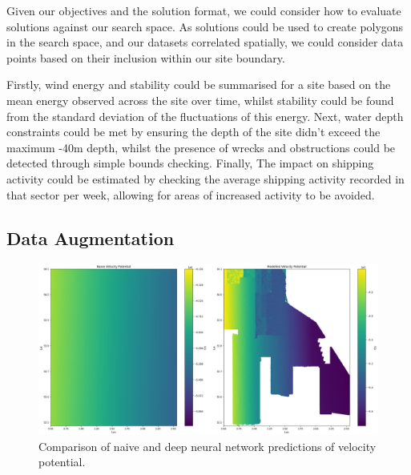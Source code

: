 \documentclass[preprint,12pt]{elsarticle}
\begin{document}
Given our objectives and the solution format, we could consider how to evaluate solutions against our search space. As solutions could be used to create polygons in the search space, and our datasets correlated spatially, we could consider data points based on their inclusion within our site boundary. 

Firstly, wind energy and stability could be summarised for a site based on the mean energy observed across the site over time, whilst stability could be found from the standard deviation of the fluctuations of this energy. Next, water depth constraints could be met by ensuring the depth of the site didn’t exceed the maximum -40m depth, whilst the presence of wrecks and obstructions could be detected through simple bounds checking. Finally, The impact on shipping activity could be estimated by checking the average shipping activity recorded in that sector per week, allowing for areas of increased activity to be avoided.

\newpage
\subsection{Data Augmentation}

\begin{figure}[h!]
    \includegraphics[width=\textwidth,height=\textheight,keepaspectratio]{images/naive_versus_model_velocity_predictions.png}
    \caption{Comparison of naive and deep neural network predictions of velocity potential.}
    \label{fig:naive_versus_model_velocity_predictions}
\end{figure}
\end{document}
